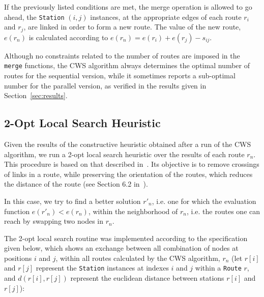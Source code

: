 If the previously listed conditions are met, the merge operation is allowed to 
go ahead, the \verb?Station? $(i,j)$ instances, at the appropriate edges of each 
route $r_i$ and $r_j$, are linked in order to form a new route. The value of the 
new route, $e(r_n)$ is calculated according to 
$e(r_n) = e(r_i) + e(r_j) - s_{ij}$.\vertbreak

Although no constraints related to the number 
of routes are imposed in the \verb?merge? functions, the CWS algorithm always 
determines the optimal number of routes for the sequential version, while it 
sometimes reports a sub-optimal number for the parallel 
version, as verified in the results given in Section~\ref{sec:results}.

\subsection{2-Opt Local Search Heuristic}
\label{subsec:2-opt}

Given the results of the constructive heuristic obtained after a run of the CWS 
algorithm, we run a 2-opt local search heuristic over the results of each route 
$r_n$. This procedure is based on that described in~\cite{Psaraftis1983391, 
Thangiahl1996}. Its objective is to remove crossings of links in a route, while 
preserving the orientation of the routes, which reduces the distance of the 
route (see Section 6.2 in~\cite{Michalewicz2004}).\vertbreak

In this case, we try to find a better solution $r'_n$, i.e. one for which the 
evaluation function $e(r'_n) < e(r_n)$, within the neighborhood of $r_n$, i.e. 
the routes one can reach by swapping two nodes in $r_n$.\vertbreak

The 2-opt local search routine was implemented according to the specification 
given below, which shows an exchange between all combination of nodes at 
positions $i$ and $j$, within all routes calculated by the CWS algorithm, 
$r_n$ (let $r[i]$ and $r[j]$ represent the \verb+Station+ instances at indexes 
$i$ and $j$ within a \verb+Route+ $r$, and $d(r[i], r[j])$ represent the 
euclidean distance between stations $r[i]$ and $r[j]$):\vertbreak

